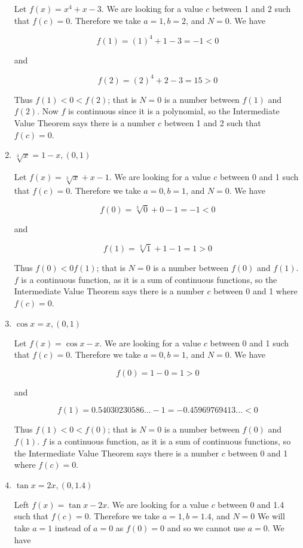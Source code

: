 \documentclass{article}
\begin{document}
\begin{enumerate}
				Let $f(x) = x^4 + x - 3$. We are looking for a value $c$ between 1 and 2
				such that $f(c) = 0$. Therefore we take $a = 1, b = 2$, and $N = 0$. We
				have

				$$f(1) = (1)^4 + 1 - 3 = -1 < 0$$

				and

				$$f(2) = (2)^4 + 2 - 3 = 15 > 0$$

				Thus $f(1) < 0 < f(2)$; that is $N = 0$ is a number between $f(1)$ and
				$f(2)$. Now $f$ is continuous since it is a polynomial, so the Intermediate
				Value Theorem says there is a number $c$ between 1 and 2 such that
				$f(c) = 0$.

			\item $\sqrt[3]{x} = 1 - x, (0, 1)$

				Let $f(x) = \sqrt[3]{x} + x - 1$. We are looking for a value $c$ between
				0 and 1 such that $f(c) = 0$. Therefore we take $a = 0, b = 1$, and $N = 0$.
				We have

				$$f(0) = \sqrt[3]{0} + 0 - 1 = -1 < 0$$

				and

				$$f(1) = \sqrt[3]{1} + 1 - 1 = 1 > 0$$

				Thus $f(0) < 0 f(1)$; that is $N = 0$ is a number between $f(0)$ and $f(1)$.
				$f$ is a continuous function, as it is a sum of continuous functions, so the
				Intermediate Value Theorem says there is a number $c$ between 0 and 1 where
				$f(c) = 0$.

			\item $\cos x = x, (0,1)$

				Let $f(x) = \cos x - x$. We are looking for a value $c$ between 0 and 1 such
				that $f(c) = 0$. Therefore we take $a = 0, b = 1$, and $N = 0$. We have

				$$f(0) = 1 - 0 = 1 > 0$$

				and 

				$$f(1) = 0.54030230586... - 1 = -0.45969769413... < 0$$

				Thus $f(1) < 0 < f(0)$; that is $N = 0$ is a number between $f(0)$ and $f(1)$.
				$f$ is a continuous function, as it is a sum of continuous functions, so the
				Intermediate Value Theorem says there is a number $c$ between 0 and 1 where
				$f(c) = 0$.

			\item $\tan x = 2x, (0,1.4)$

				Left $f(x) = \tan x - 2x$. We are looking for a value $c$ between 0 and 1.4
				such that $f(c) = 0$. Therefore we take $a = 1, b = 1.4$, and $N = 0$ We will
				take $a=1$ instead of $a=0$ as $f(0) = 0$ and so we cannot use $a=0$. We
				have 


\end{enumerate}
\end{document}
